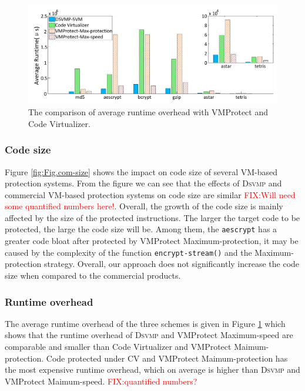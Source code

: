 \documentclass[preprint,12pt,3p]{elsarticle}
\newcommand{\DSVMP}{\textsc{Dsvmp}\xspace}
\newcommand\FIXME[1]{\textcolor{red}{FIX:}\textcolor{red}{#1}}
\begin{document}
\begin{figure}[t]%
    \centering
    \includegraphics[width=0.9\columnwidth]{figure/comtime.pdf}
    \caption{The comparison of average runtime overhead with VMProtect and Code Virtualizer.}\label{fig:Fig.com-time}
\end{figure}


\subsubsection{Code size} Figure \ref{fig:Fig.com-size} shows the impact on code size of several VM-based protection systems.
From the figure we can see that the effects of \DSVMP and commercial VM-based protection systems on code size are similar \FIXME{Will need some quantified numbers here!}.
Overall, the growth of the code size is mainly affected by the size of the protected instructions.
The larger the target code to be protected, the large the code size will be. 
Among them, the \texttt{aescrypt} has a greater code bloat after protected by VMProtect Maximum-protection,
it may be caused by the complexity of the function \texttt{encrypt-stream()} and the Maximum-protection strategy.
Overall, our approach does not significantly increase the code size when compared to the commercial products. 


\subsubsection{Runtime overhead} The average runtime overhead of the three schemes is given in Figure \ref{fig:Fig.com-time} 
which shows that the runtime overhead of \DSVMP and VMProtect Maximum-speed
are comparable and smaller than Code Virtualizer and VMProtect Maimum-protection.
Code protected under CV and VMProtect Maimum-protection has the most expensive runtime overhead,
which on average is higher than \DSVMP and VMProtect Maimum-speed. \FIXME{quantified numbers?}

\end{document}
